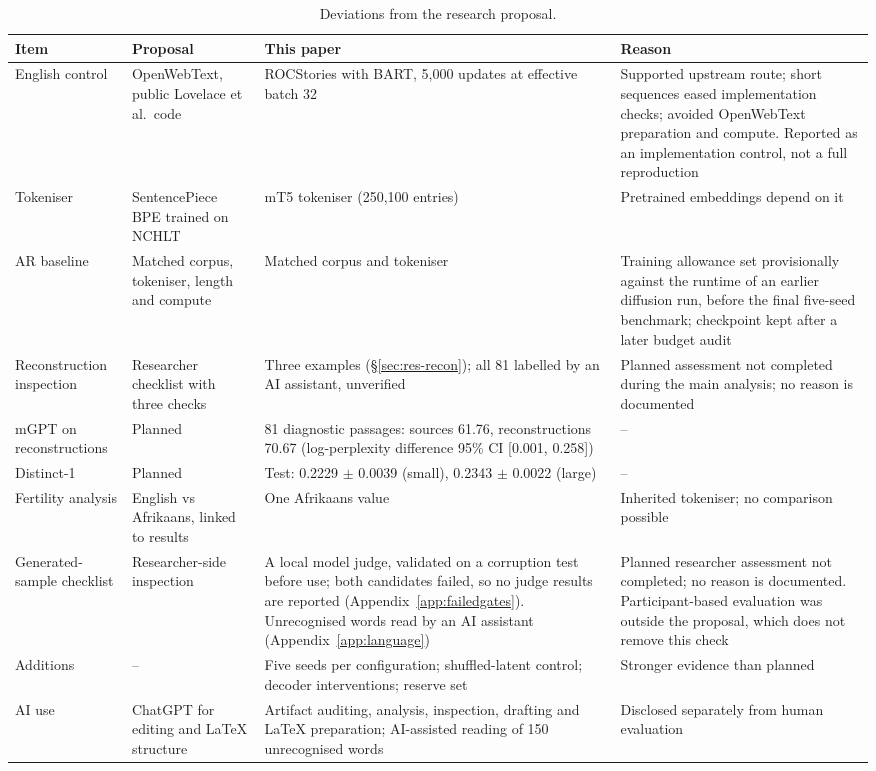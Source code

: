 \documentclass[11pt,a4paper]{article}
\begin{document}
\begin{table}[t]
\centering
\small
\begin{tabularx}{\textwidth}{@{}p{2.4cm}XXX@{}}
\toprule
Item & Proposal & This paper & Reason \\
\midrule
English control & OpenWebText, public Lovelace et al.\ code & ROCStories with BART, 5,000 updates at effective batch 32 & Supported upstream route; short sequences eased implementation checks; avoided OpenWebText preparation and compute. Reported as an implementation control, not a full reproduction \\
Tokeniser & SentencePiece BPE trained on NCHLT & mT5 tokeniser (250,100 entries) & Pretrained embeddings depend on it \\
AR baseline & Matched corpus, tokeniser, length and compute & Matched corpus and tokeniser & Training allowance set provisionally against the runtime of an earlier diffusion run, before the final five-seed benchmark; checkpoint kept after a later budget audit \\
Reconstruction inspection & Researcher checklist with three checks & Three examples (\S\ref{sec:res-recon}); all 81 labelled by an AI assistant, unverified & Planned assessment not completed during the main analysis; no reason is documented \\
mGPT on reconstructions & Planned & 81 diagnostic passages: sources 61.76, reconstructions 70.67 (log-perplexity difference 95\% CI [0.001, 0.258]) & -- \\
Distinct-1 & Planned & Test: 0.2229 $\pm$ 0.0039 (small), 0.2343 $\pm$ 0.0022 (large) & -- \\
Fertility analysis & English vs Afrikaans, linked to results & One Afrikaans value & Inherited tokeniser; no comparison possible \\
Generated-sample checklist & Researcher-side inspection & A local model judge, validated on a corruption test before use; both candidates failed, so no judge results are reported (Appendix~\ref{app:failedgates}). Unrecognised words read by an AI assistant (Appendix~\ref{app:language}) & Planned researcher assessment not completed; no reason is documented. Participant-based evaluation was outside the proposal, which does not remove this check \\
Additions & -- & Five seeds per configuration; shuffled-latent control; decoder interventions; reserve set & Stronger evidence than planned \\
AI use & ChatGPT for editing and LaTeX structure & Artifact auditing, analysis, inspection, drafting and LaTeX preparation; AI-assisted reading of 150 unrecognised words & Disclosed separately from human evaluation \\
\bottomrule
\end{tabularx}
\caption{Deviations from the research proposal.}
\label{tab:deviations}
\end{table}
\end{document}
